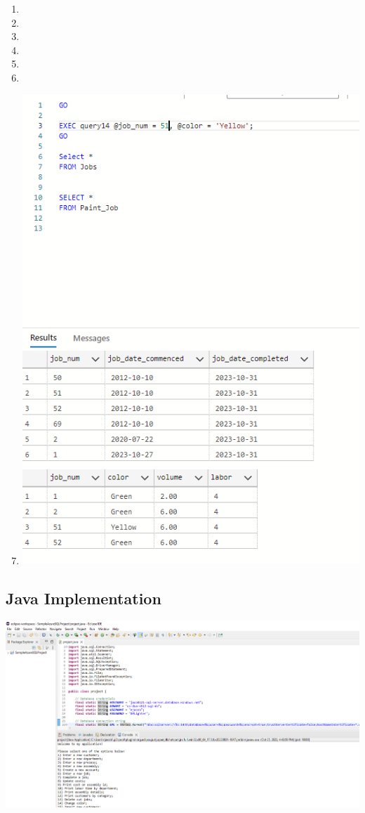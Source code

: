 \documentclass[11pt]{article}
\begin{document}
\begin{enumerate}
\item
\item
\item
\item
\item
\item
\item
\includegraphics[width = \textwidth]{changepaint.png}

\end{enumerate}
\subsection{Java Implementation}
\includegraphics[width = \textwidth]{JavaSuccess.png}
\end{document}
